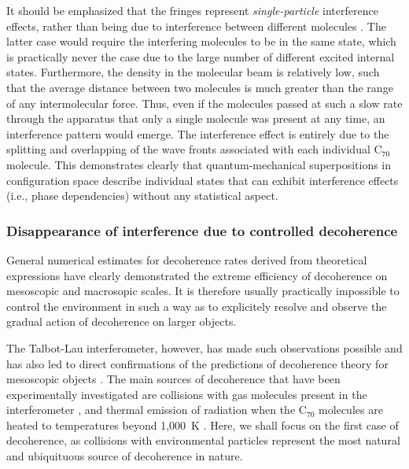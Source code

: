 \documentclass[twocolumn,aps,floatfix,amsmath,amssymb,showpacs,nofootinbib]{revtex4}
\begin{document}
It should be emphasized that the fringes represent {\em
  single-particle} interference effects, rather than being due to
interference between different molecules \cite{Nairz:2003:um}. The
latter case would require the interfering molecules to be in the same
state, which is practically never the case due to the large number of
different excited internal states. Furthermore, the density in the
molecular beam is relatively low, such that the average distance
between two molecules is much greater than the range of any
intermolecular force. Thus, even if the molecules passed at such a
slow rate through the apparatus that only a single molecule was
present at any time, an interference pattern would emerge. The
interference effect is entirely due to the splitting and overlapping
of the wave fronts associated with each individual C$_{70}$ molecule.
This demonstrates clearly that quantum-mechanical superpositions in
configuration space describe individual states that can exhibit
interference effects (i.e., phase dependencies) without any
statistical aspect.


\subsubsection{Disappearance of interference
  due to controlled decoherence} \label{sec:diffrac-dec}

General numerical estimates for decoherence rates derived from
theoretical expressions
\cite{Joos:1985:iu,Gallis:1990:un,Tegmark:1993:uz,Hornberger:2003:un}
have clearly demonstrated the extreme efficiency of decoherence on
mesoscopic and macrosopic scales. It is therefore usually practically
impossible to control the environment in such a way as to explicitely
resolve and observe the gradual action of decoherence on larger
objects.

The Talbot-Lau interferometer, however, has made such observations
possible and has also led to direct confirmations of the predictions
of decoherence theory for mesoscopic objects
\cite{Hackermuller:2003:uu,Hornberger:2003:tv,%
Hackermuller:2004:rd,Hornberger:2004:bb,Hornberger:2005:mo}. The main sources of
decoherence that have been experimentally investigated are collisions
with gas molecules present in the interferometer
\cite{Hornberger:2003:tv,Hackermuller:2003:uu,Hornberger:2004:bb}, and
thermal emission of radiation when the C$_{70}$ molecules are heated
to temperatures beyond 1,000~K
\cite{Hackermuller:2004:rd,Hornberger:2005:mo}. Here, we shall focus
on the first case of decoherence, as collisions with environmental
particles represent the most natural and ubiquituous source of
decoherence in nature.
\end{document}
